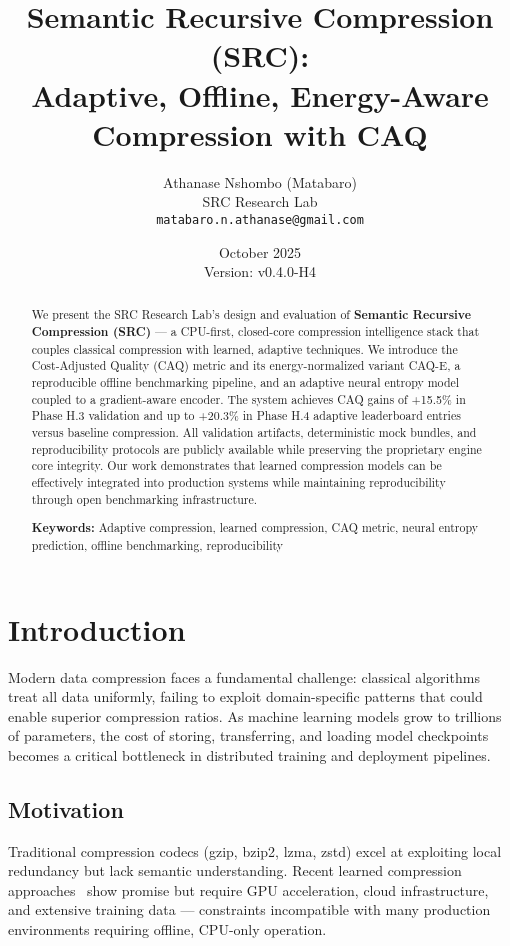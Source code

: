 \documentclass[11pt,twocolumn]{article}
\title{Semantic Recursive Compression (SRC): \\
Adaptive, Offline, Energy-Aware Compression with CAQ}
\author{
Athanase Nshombo (Matabaro) \\
SRC Research Lab \\
\texttt{matabaro.n.athanase@gmail.com}
}
\date{October 2025 \\ Version: v0.4.0-H4}
\begin{document}
\maketitle

\begin{abstract}
We present the SRC Research Lab's design and evaluation of \textbf{Semantic Recursive Compression (SRC)} — a CPU-first, closed-core compression intelligence stack that couples classical compression with learned, adaptive techniques. We introduce the Cost-Adjusted Quality (CAQ) metric and its energy-normalized variant CAQ-E, a reproducible offline benchmarking pipeline, and an adaptive neural entropy model coupled to a gradient-aware encoder. The system achieves CAQ gains of +15.5\% in Phase H.3 validation and up to +20.3\% in Phase H.4 adaptive leaderboard entries versus baseline compression. All validation artifacts, deterministic mock bundles, and reproducibility protocols are publicly available while preserving the proprietary engine core integrity. Our work demonstrates that learned compression models can be effectively integrated into production systems while maintaining reproducibility through open benchmarking infrastructure.

\textbf{Keywords:} Adaptive compression, learned compression, CAQ metric, neural entropy prediction, offline benchmarking, reproducibility
\end{abstract}

\section{Introduction}

Modern data compression faces a fundamental challenge: classical algorithms treat all data uniformly, failing to exploit domain-specific patterns that could enable superior compression ratios. As machine learning models grow to trillions of parameters, the cost of storing, transferring, and loading model checkpoints becomes a critical bottleneck in distributed training and deployment pipelines.

\subsection{Motivation}

Traditional compression codecs (gzip, bzip2, lzma, zstd) excel at exploiting local redundancy but lack semantic understanding. Recent learned compression approaches~\cite{balle2018variational} show promise but require GPU acceleration, cloud infrastructure, and extensive training data — constraints incompatible with many production environments requiring offline, CPU-only operation.
\end{document}
